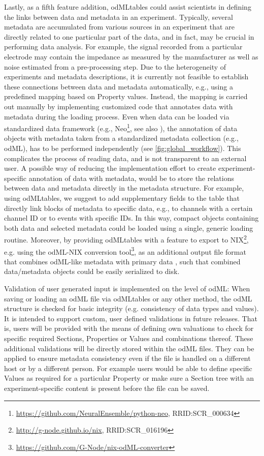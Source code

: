 Lastly, as a fifth feature addition, odMLtables could assist scientists in defining the links between data and metadata in an experiment. Typically, several metadata are accumulated from various sources in an experiment that are directly related to one particular part of the data, and in fact, may be crucial in performing data analysis. For example, the signal recorded from a particular electrode may contain the impedance as measured by the manufacturer as well as noise estimated from a pre-processing step. Due to the heterogeneity of experiments and metadata descriptions, it is currently not feasible to establish these connections between data and metadata automatically, e.g., using a predefined mapping based on Property values. Instead, the mapping is carried out manually by implementing customized code that annotates data with metadata during the loading process. Even when data can be loaded via standardized data framework (e.g., Neo\footnote{\url{https://github.com/NeuralEnsemble/python-neo}, RRID:SCR\_000634}, see also \citealp{Garcia_2014}), the annotation of data objects with metadata taken from a standardized metadata collection (e.g., odML), has to be performed independently (see \cref{fig:global_workflow}). This complicates the process of reading data, and is not transparent to an external user. A possible way of reducing the implementation effort to create experiment-specific annotation of data with metadata, would be to store the relations between data and metadata directly in the metadata structure. For example, using odMLtables, we suggest to add supplementary fields to the table that directly link blocks of metadata to specific data, e.g., to channels with a certain channel ID or to events with specific IDs. In this way, compact objects containing both data and selected metadata could be loaded using a single, generic loading routine. Moreover, by providing odMLtables with a feature to export to NIX\footnote{\url{http://g-node.github.io/nix}, RRID:SCR\_016196}, e.g. using the odML-NIX conversion tool\footnote{\url{https://github.com/G-Node/nix-odML-converter}}, as an additional output file format that combines odML-like metadata with primary data \citep{Stoewer_2014}, such that combined data/metadata objects could be easily serialized to disk.

Validation of user generated input is implemented on the level of odML: When saving or loading an odML file via odMLtables or any other method, the odML structure is checked for basic integrity (e.g. consistency of data types and values). It is intended to support custom, user defined validations in future releases. That is, users will be provided with the means of defining own valuations to check for specific required Sections, Properties or Values and combinations thereof. These additional validations will be directly stored within the odML files. They can be applied to ensure metadata consistency even if the file is handled on a different host or by a different person.
For example users would be able to define specific Values as required for a particular Property or make sure a Section tree with an experiment-specific content is present before the file can be saved.

